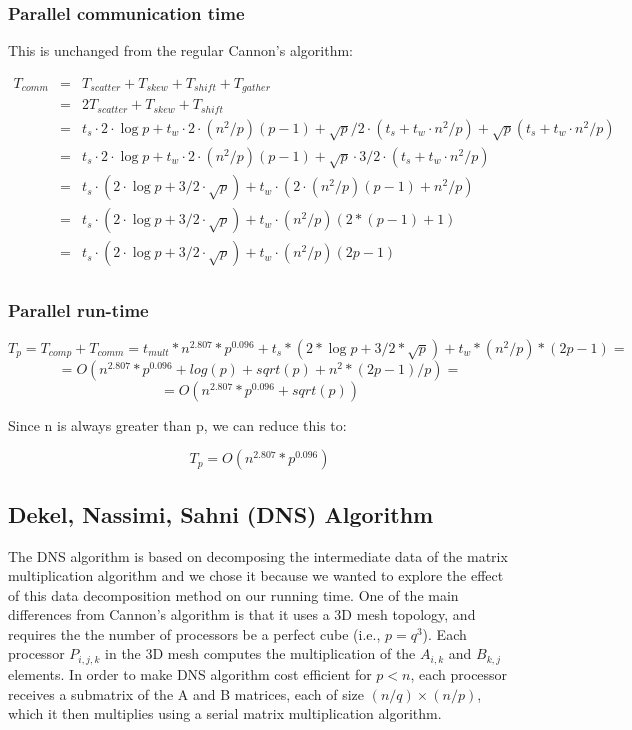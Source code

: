 \documentclass{article}
\begin{document}
\subsubsection{Parallel communication time}

This is unchanged from the regular Cannon's algorithm:

\begin{eqnarray*}
T_{{comm}} 	&=& T_{{scatter}} + T_{{skew}} + T_{{shift}} + T_{{gather}} \\
			&=& 2 T_{{scatter}} + T_{{skew}} + T_{{shift}} \\
			&=& t_s \cdot 2 \cdot \log{p} + t_w \cdot 2 \cdot (n^2/p)(p-1) + \sqrt{p}/2 \cdot (t_s + t_w \cdot n^2/p) + \sqrt{p}(t_s + t_w \cdot n^2/p) \\
			&=& t_s \cdot 2 \cdot \log{p} + t_w \cdot 2 \cdot (n^2/p)(p-1) + \sqrt{p} \cdot 3/2 \cdot (t_s + t_w \cdot n^2/p) \\
			&=& t_s \cdot (2 \cdot \log{p} + 3/2 \cdot \sqrt{p}) + t_w \cdot (2 \cdot (n^2/p)(p-1) + n^2/p) \\
			&=& t_s \cdot (2 \cdot \log{p} + 3/2 \cdot \sqrt{p}) + t_w \cdot (n^2/p)(2*(p-1) + 1) \\
			&=& t_s \cdot (2 \cdot \log{p} + 3/2 \cdot \sqrt{p}) + t_w \cdot (n^2/p)(2p-1) \\
\end{eqnarray*}

\subsubsection{Parallel run-time}

$$T_p = T_{{comp}} + T_{{comm}} = t_{{mult}} * n^2.807 * p^0.096 + t_s*(2*\log{p} + 3/2*\sqrt{p}) + t_w*(n^2/p)*(2p-1) =$$
$$	= O(n^2.807 * p^0.096 + log(p) + sqrt(p) + n^2*(2p-1)/p) =$$
$$	= O(n^2.807 * p^0.096 + sqrt(p))$$

Since n is always greater than p, we can reduce this to:

$$	T_p = O(n^{2.807} * p^{0.096})$$




\subsection{Dekel, Nassimi, Sahni (DNS) Algorithm}

The DNS algorithm is based on decomposing the intermediate data of the matrix
multiplication algorithm and we chose it because we wanted to explore the effect
of this data decomposition method on our running time. One of the main
differences from Cannon's algorithm is that it uses a 3D mesh topology, and
requires the the number of processors be a perfect cube (i.e., $p = q^3$). Each
processor $P_{i,j,k}$ in the 3D mesh computes the multiplication of the
$A_{i,k}$ and $B_{k,j}$ elements.  In order to make DNS algorithm cost efficient
for $p < n$, each processor receives a submatrix of the A and B matrices, each
of size $(n/q) \times (n/p)$, which it then multiplies using a serial matrix
multiplication algorithm.
\end{document}

